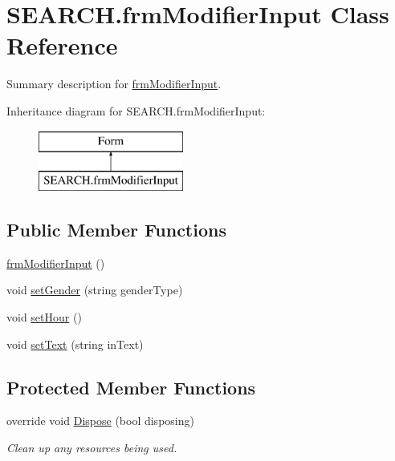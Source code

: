 \hypertarget{class_s_e_a_r_c_h_1_1frm_modifier_input}{\section{S\-E\-A\-R\-C\-H.\-frm\-Modifier\-Input Class Reference}
\label{class_s_e_a_r_c_h_1_1frm_modifier_input}
}


Summary description for \hyperlink{class_s_e_a_r_c_h_1_1frm_modifier_input}{frm\-Modifier\-Input}.  


Inheritance diagram for S\-E\-A\-R\-C\-H.\-frm\-Modifier\-Input\-:\begin{figure}[H]
\begin{center}
\leavevmode
\includegraphics[height=2.000000cm]{class_s_e_a_r_c_h_1_1frm_modifier_input}
\end{center}
\end{figure}
\subsection*{Public Member Functions}
\begin{DoxyCompactItemize}
\item 
\hyperlink{class_s_e_a_r_c_h_1_1frm_modifier_input_a40ce365148ac1f28f502f5ac00e3af45}{frm\-Modifier\-Input} ()
\item 
void \hyperlink{class_s_e_a_r_c_h_1_1frm_modifier_input_a17ab749d0bb216161dc7b5097c3dabb8}{set\-Gender} (string gender\-Type)
\item 
void \hyperlink{class_s_e_a_r_c_h_1_1frm_modifier_input_a15cd673e516352b34d523ef1b9ed61c0}{set\-Hour} ()
\item 
void \hyperlink{class_s_e_a_r_c_h_1_1frm_modifier_input_a1c1d60dfda5e8ff391911592de5a2b40}{set\-Text} (string in\-Text)
\end{DoxyCompactItemize}
\subsection*{Protected Member Functions}
\begin{DoxyCompactItemize}
\item 
override void \hyperlink{class_s_e_a_r_c_h_1_1frm_modifier_input_a04b003e7055df59a2f00cdcdb82ba976}{Dispose} (bool disposing)
\begin{DoxyCompactList}\small\item\em Clean up any resources being used. \end{DoxyCompactList}\end{DoxyCompactItemize}

